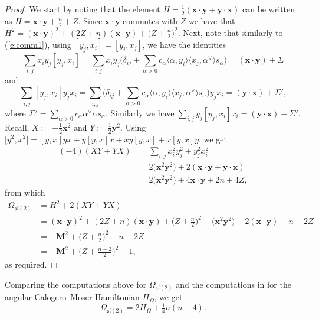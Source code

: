 \documentclass[pdftex]{sigma}
\numberwithin{equation}{section}
\newcommand{\fl}{\mathfrak{l}}
\newcommand{\fs}{\mathfrak{s}}
\newcommand{\bx}{\mathbf{x}}
\newcommand{\by}{\mathbf{y}}
\newcommand{\bM}{\mathbf{M}}
\begin{document}
\begin{proof}
We start by noting that the element $H =\tfrac{1}{2}(\bx\cdot\by + \by\cdot\bx)$ can be written as
$H = \bx\cdot\by + \tfrac{n}{2} +Z$.
Since $\bx\cdot\by$ commutes with $Z$ we have that $H^2 = (\bx\cdot\by)^2 + (2Z+n)(\bx\cdot\by) + \big(Z+\tfrac{n}{2}\big)^2$. Next, note that similarly to
(\ref{e:comm1}), using $[y_j,x_i]=[y_i,x_j]$, we have the identities
\begin{equation*}
\sum_{i,j} x_iy_j[y_j,x_i] = \sum_{i,j}x_iy_j\bigg(\delta_{ij} + \sum_{\alpha>0}c_\alpha \langle \alpha,y_i\rangle\langle x_j,\alpha^\vee \rangle s_\alpha\bigg)
= (\bx\cdot\by) + \Sigma
\end{equation*}
and
\begin{equation*}
\sum_{i,j} [y_j,x_i]y_jx_i= \sum_{i,j}\bigg(\delta_{ij} + \sum_{\alpha>0}c_\alpha \langle \alpha,y_i\rangle\langle x_j,\alpha^\vee \rangle s_\alpha\bigg)y_jx_i
= (\by\cdot\bx) + \Sigma',
\end{equation*}
where $\Sigma'= \sum_{\alpha>0}c_\alpha \alpha^\vee\alpha s_\alpha$. Similarly we have $\sum_{i,j} y_j[y_j,x_i]x_i = (\by\cdot\bx) - \Sigma'$. Recall, $X:= -\tfrac{1}{2}\bx^2$ and $Y:=\tfrac{1}{2} \by^2$. Using
$\big[y^2,x^2\big] = [y,x]yx+y[y,x]x + xy[y,x] + x[y,x]y$, we get
\begin{align*}
(-4)(XY + YX) &= \sum_{i,j} x_i^2y_j^2 + y_j^2x_i^2\\
&= 2\big(\bx^2\by^2\big) + 2(\bx\cdot\by + \by\cdot\bx)\\
&= 2\big(\bx^2\by^2\big) + 4\bx\cdot\by +2n + 4Z,
\end{align*}
from which
\begin{align*}
\Omega_{\fs\fl(2)} &= H^2 + 2(XY + YX) \\
&= (\bx\cdot\by)^2 + (2Z+n)(\bx\cdot\by) + \big(Z+\tfrac{n}{2}\big)^2 - \big(\bx^2\by^2\big) - 2(\bx\cdot\by) -n -2Z \\
&= -\bM^2 + \big(Z + \tfrac{n}{2}\big)^2 -n -2Z\\
&= -\bM^2 + \big(Z + \tfrac{n-2}{2}\big)^2 - 1,
\end{align*}
as required.
\end{proof}

\begin{Remark}\label{r:AngHamiltonian}
Comparing the computations above for $\Omega_{\fs\fl(2)}$ and the computations in \cite{FH15} for the angular Calogero--Moser Hamiltonian $H_\Omega$, we get
\[
\Omega_{\fs\fl(2)} = 2H_\Omega + \tfrac{1}{4}n(n-4).
\]
\end{Remark}
\end{document}
